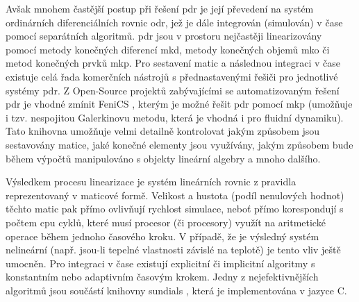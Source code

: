 
Avšak mnohem častější postup při řešení \acrshort{pdr} je její převedení na
systém ordinárních diferenciálních rovnic \acrshort{odr}, jež je dále
integrován (simulován) v čase pomocí separátních algoritmů. \acrshort{pdr} jsou
v prostoru nejčastěji linearizovány pomocí metody konečných diferencí
\acrshort{mkd}, metody konečných objemů \acrshort{mko} či metod konečných prvků
\acrshort{mkp}. Pro sestavení matic a následnou integraci v čase existuje
celá řada komerčních nástrojů s přednastavenými řešiči pro jednotlivé systémy
\acrshort{pdr}. Z Open-Source projektů zabývajícími se automatizovaným řešení
\acrshort{pdr} je vhodné zmínit FeniCS \cite{AlnaesBlechta2015a}, kterým je
možné řešit \acrshort{pdr} pomocí \acrshort{mkp} (umožňuje i tzv. nespojitou
Galerkinovu metodu, která je vhodná i pro fluidní dynamiku). Tato knihovna
umožňuje velmi detailně kontrolovat jakým způsobem jsou sestavovány matice,
jaké konečné elementy jsou využívány, jakým způsobem bude během výpočtů
manipulováno s objekty lineární algebry a mnoho dalšího.

Výsledkem procesu linearizace je systém lineárních rovnic z pravidla
reprezentovaný v maticové formě. Velikost a hustota (podíl nenulových hodnot)
těchto matic pak přímo ovlivňují rychlost simulace, neboť přímo korespondují s
počtem \acrshort{cpu} cyklů, které musí procesor (či procesory) využít na
aritmetické operace během jednoho časového kroku. V případě, že je výsledný
systém nelineární (např. jsou-li tepelné vlastnosti závislé na teplotě) je
tento vliv ještě umocněn. Pro integraci v čase existují explicitní či
implicitní algoritmy s konstantním nebo adaptivním časovým krokem. Jedny z
nejefektivnějších algoritmů jsou součástí knihovny \acrshort{sundials}
\cite{sundials}, která je implementována v jazyce C.

